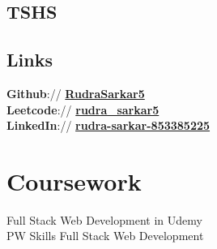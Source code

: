 \documentclass{deedy-resume-openfont}
\begin{document}
\begin{minipage}[t]{0.33\textwidth}
\subsection{TSHS}




\sectionsep


\sectionsep


\subsection{Links} 

\textbf{Github}:// \href{https://github.com/RudraSarkar5}{\bf RudraSarkar5} \\
\textbf{Leetcode}://  \href{https://leetcode.com/Rudra_sarkar5/}{\bf rudra_sarkar5} \\
\textbf{LinkedIn}://  \href{www.linkedin.com/in/rudra-sarkar-853385225}{\bf rudra-sarkar-853385225} \\





\section{Coursework}

Full Stack Web Development in Udemy \\
PW Skills Full Stack Web Development \\

\sectionsep






%
%

\end{minipage} 
\hfill
\end{document}
